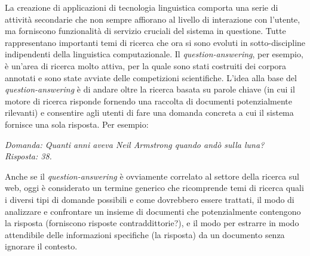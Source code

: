 \documentclass[]{../../metanetpaper}
\begin{document}
\begin{multicols}{2}
La creazione di applicazioni di tecnologia linguistica comporta una serie di
attivit\`{a} secondarie che non sempre affiorano al livello di interazione con
l'utente, ma forniscono funzionalit\`{a} di servizio cruciali del
sistema in questione. Tutte rappresentano importanti temi di ricerca che
ora si sono evoluti in sotto-discipline indipendenti della linguistica
computazionale. Il \emph{question-answering}, per esempio, \`{e} un'area di ricerca molto attiva, per la quale sono stati costruiti dei corpora annotati e sono state avviate delle competizioni scientifiche. L'idea alla base del \emph{question-answering} \`{e} di andare oltre la ricerca basata su parole chiave (in cui il motore di ricerca risponde fornendo una raccolta di documenti potenzialmente rilevanti) e consentire agli utenti di fare una domanda concreta a cui il sistema fornisce una sola risposta. Per esempio:



\textit{Domanda: Quanti anni aveva Neil Armstrong quando and\`{o} sulla luna?}\\
\textit{Risposta: 38.}

Anche se il \emph{question-answering} \`{e} ovviamente correlato al settore della ricerca sul web, oggi \`{e} considerato un termine generico che ricomprende temi di ricerca quali i diversi tipi di domande possibili e come dovrebbero essere trattati, il modo di analizzare e confrontare un insieme di documenti che potenzialmente contengono la risposta (forniscono risposte contraddittorie?), e il modo per estrarre in modo attendibile delle informazioni specifiche (la risposta) da un documento senza ignorare il contesto.



\end{multicols}
\end{document}
